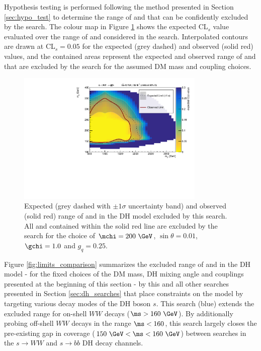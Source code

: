 Hypothesis testing is performed following the method presented in Section \ref{sec:hypo_test} to determine the range of \ms and \mZp that can be confidently excluded by the search. The colour map in Figure \ref{fig:limits} shows the expected CL\(_s\) value evaluated over the range of \ms and \mZp considered in the search. Interpolated contours are drawn at CL\(_s=0.05\) for the expected (grey dashed) and observed (solid red) values, and the contained areas represent the expected and observed range of \ms and \mZp that are excluded by the search for the assumed DM mass and coupling choices.

\begin{figure}[h]
  \centering
  \includegraphics[width=0.8\textwidth]{Figures/8/unblinded_nosig.pdf}
  \caption[]{Expected (grey dashed with \(\pm1\sigma\) uncertainty band) and observed (solid red) range of \ms and \mZp in the DH model excluded by this search. All \ms and \mZp contained within the solid red line are excluded by the search for the choice of \(\mchi=200~\GeV\), \(\sin\theta=0.01\), \(\gchi=1.0\) and \(g_q=0.25\).}
  \label{fig:limits}
\end{figure}

Figure \ref{fig:limits_comparison} summarizes the excluded range of \ms and \mZp in the DH model - for the fixed choices of the DM mass, DH mixing angle and couplings presented at the beginning of this section - by this and all other searches presented in Section \ref{sec:dh_searches} that place constraints on the model by targeting various decay modes of the DH boson \(s\). This search (blue) extends the excluded range for on-shell \(WW\) decays (\(\ms>160~\GeV\)). By additionally probing off-shell \(WW\) decays in the range \(\ms<160\), this search largely closes the pre-existing gap in coverage (\(150~\GeV<\ms<160~\GeV\)) between searches in the \(s\rightarrow WW\) and \(s\rightarrow bb\) DH decay channels.

